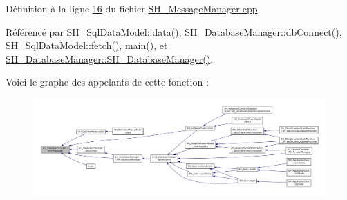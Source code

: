 Définition à la ligne \hyperlink{SH__MessageManager_8cpp_source_l00016}{16} du fichier \hyperlink{SH__MessageManager_8cpp_source}{S\-H\-\_\-\-Message\-Manager.\-cpp}.



Référencé par \hyperlink{classSH__SqlDataModel_a30cc763618d73a1bb5410c84812c0b9f}{S\-H\-\_\-\-Sql\-Data\-Model\-::data()}, \hyperlink{classSH__DatabaseManager_aeb077fe5437f435c0cbe8d77d96dd846}{S\-H\-\_\-\-Database\-Manager\-::db\-Connect()}, \hyperlink{classSH__SqlDataModel_a8d9b08d282a304945b9ee2f474020980}{S\-H\-\_\-\-Sql\-Data\-Model\-::fetch()}, \hyperlink{main_8cpp_a3c04138a5bfe5d72780bb7e82a18e627}{main()}, et \hyperlink{classSH__DatabaseManager_a7b5d0e372c153eb59cdab98588994904}{S\-H\-\_\-\-Database\-Manager\-::\-S\-H\-\_\-\-Database\-Manager()}.




Voici le graphe des appelants de cette fonction \-:\nopagebreak
\begin{figure}[H]
\begin{center}
\leavevmode
\includegraphics[width=350pt]{classSH__MessageManager_acb5615cc90f198f4768da800a5d32362_icgraph}
\end{center}
\end{figure}


